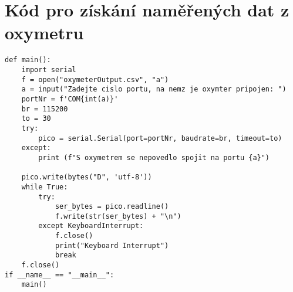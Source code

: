 \section{Kód pro získání naměřených dat z oxymetru}
\label{appn:Python}
\begin{lstlisting}
def main():
    import serial
    f = open("oxymeterOutput.csv", "a")
    a = input("Zadejte cislo portu, na nemz je oxymter pripojen: ")
    portNr = f'COM{int(a)}'
    br = 115200
    to = 30
    try:
        pico = serial.Serial(port=portNr, baudrate=br, timeout=to)
    except:
        print (f"S oxymetrem se nepovedlo spojit na portu {a}")

    pico.write(bytes("D", 'utf-8'))
    while True:
        try:
            ser_bytes = pico.readline()
            f.write(str(ser_bytes) + "\n")
        except KeyboardInterrupt:
            f.close()
            print("Keyboard Interrupt")
            break
    f.close()
if __name__ == "__main__":
    main()
\end{lstlisting}